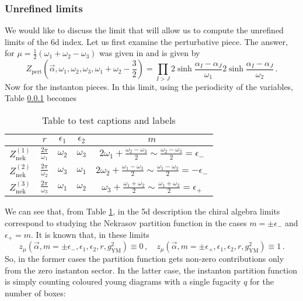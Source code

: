 \documentclass[main.tex]{subfiles}
\begin{document}
\subsubsection{Unrefined limits}
We would like to discuss the limit that will allow us to compute the unrefined limits of the 6d index. Let us first examine the perturbative piece. The answer, for $\mu=\frac{1}{2}(\omega_1+\omega_2-\omega_3)$ was given in \cite{} and is given by
\begin{equation}
Z_{\text{pert}}\left(\vec{\alpha},\omega_1,\omega_2,\omega_3,\omega_1+\omega_2-\frac{3}{2}\right)=\prod_{I>J}2\sinh\frac{\alpha_I-\alpha_J}{\omega_1}2\sinh\frac{\alpha_I-\alpha_J}{\omega_2}\,.
\end{equation}
Now for the instanton pieces. In this limit, using the periodicity of the variables, Table \ref{} becomes
\begin{table}[h!]
\centering
\begin{tabular}{|c c c c c|} 
 \hline
 & $r$ & $\epsilon_1$ & $\epsilon_2$ & $m$ \\ [0.5ex] 
 \hline\hline
  $Z^{(1)}_{\text{nek}}$ & $\frac{2\pi}{\omega_1}$ & $\omega_2$ & $\omega_3$ &$2 \omega_1 + \frac{\omega_2- \omega_3}{2}\sim\frac{\omega_2-\omega_3}{2}=\epsilon_-$ \\ 
  $Z^{(2)}_{\text{nek}}$ & $\frac{2\pi}{\omega_2}$ & $\omega_3$ & $\omega_1$ &$2 \omega_2 + \frac{\omega_1- \omega_3}{2}\sim\frac{\omega_1-\omega_3}{2}=-\epsilon_-$ \\ 
    $Z^{(3)}_{\text{nek}}$ & $\frac{2\pi}{\omega_3}$ & $\omega_1$ & $\omega_2$ &$\omega_3 + \frac{\omega_1+ \omega_2}{2}\sim\frac{\omega_1+\omega_2}{2}=\epsilon_+$ \\ 
 \hline
\end{tabular}
\caption{Table to test captions and labels}
\label{table:unrefined}
\end{table}
We can see that, from Table \ref{table:unrefined}, in the 5d description the chiral algebra limits correspond to studying the Nekrasov partition function in the cases $m=\pm\epsilon_-$ and $\epsilon_+=m$. It is known that, in these limits
\begin{equation}
z_{\mu}(\vec{\alpha},m=\pm\epsilon_-,\epsilon_1,\epsilon_2,r,g_{\text{YM}}^2)\equiv0\,,\quad z_{\mu}(\vec{\alpha},m=\pm\epsilon_+,\epsilon_1,\epsilon_2,r,g_{\text{YM}}^2)\equiv1\,.
\end{equation}
So, in the former cases the partition function gets non-zero contributions only from the zero instanton sector. In the latter case, the instanton partition function is simply counting coloured young diagrams with a single fugacity $q$ for the number of boxes:
\end{document}
